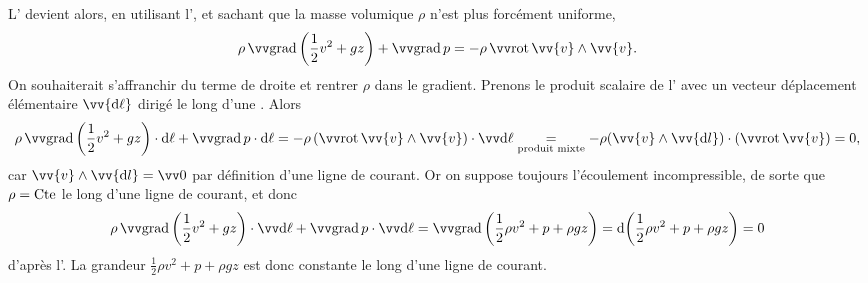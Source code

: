 \documentclass[12pt,fancy]{cours}
\begin{document}
\begin{demo}
L’ devient alors, en utilisant l', et sachant que la masse volumique $\rho$ n'est plus forcément uniforme,
\begin{equation}\label{eq:grad_bernoulli}
\rho \, \grad{\left(\frac{1}{2}v^{2} + gz\right)}  + \grad p = - \rho\, \rot{\vv{v}}\pv\vv{v}.
\end{equation}
On souhaiterait s’affranchir du terme de droite et rentrer $\rho$ dans le gradient.
Prenons le produit scalaire de l’ avec un vecteur déplacement élémentaire $\vv{\d \ell}$ dirigé le long d'une . Alors
\begin{equation}\label{eq:bernoulli_rot}
  \rho \, \grad{\left(\frac{1}{2}v^{2} + gz\right)}\ps \d \ell  + \grad p \ps \d \ell  = -\rho\, (\rot{\vv{v}}\pv\vv{v}) \cdot\Vec{\d\ell}
\underset{\text{produit mixte}}{=}-\rho (\vv{v}\pv\vv{\d l})\cdot(\rot{\vv{v}}) 
= 0,
\end{equation}
car $\vv{v}\pv \vv{\d l}=\Vec{0}$ par définition d'une ligne de courant. Or on suppose toujours l'écoulement incompressible, de sorte que $\rho = \text{Cte}$ le long d'une ligne de courant, et donc
\begin{equation}
  \rho \, \grad{\left(\frac{1}{2}v^{2} + gz\right)}\ps \dl  + \grad p \ps \dl =   \grad{\left(\frac{1}{2}\rho v^{2}+p+\rho gz\right)} = \d{\left(\frac{1}{2}\rho v^{2}+p+\rho gz\right)}  = 0
\end{equation}
d'après l'. La grandeur $\frac{1}{2}\rho v^{2}+p+\rho gz$ est donc constante le long d'une ligne de courant.
\end{demo}
\end{document}
